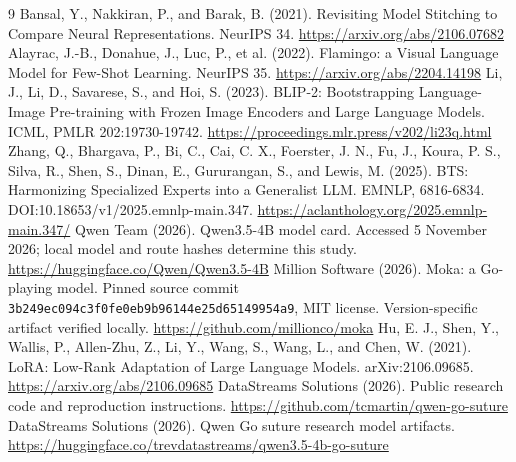 \documentclass[11pt]{article}
\begin{document}
\begin{thebibliography}{9}
 Bansal, Y., Nakkiran, P., and Barak, B. (2021). Revisiting Model Stitching to Compare Neural Representations. NeurIPS 34. \url{https://arxiv.org/abs/2106.07682}
 Alayrac, J.-B., Donahue, J., Luc, P., et al. (2022). Flamingo: a Visual Language Model for Few-Shot Learning. NeurIPS 35. \url{https://arxiv.org/abs/2204.14198}
 Li, J., Li, D., Savarese, S., and Hoi, S. (2023). BLIP-2: Bootstrapping Language-Image Pre-training with Frozen Image Encoders and Large Language Models. ICML, PMLR 202:19730-19742. \url{https://proceedings.mlr.press/v202/li23q.html}
 Zhang, Q., Bhargava, P., Bi, C., Cai, C. X., Foerster, J. N., Fu, J., Koura, P. S., Silva, R., Shen, S., Dinan, E., Gururangan, S., and Lewis, M. (2025). BTS: Harmonizing Specialized Experts into a Generalist LLM. EMNLP, 6816-6834. DOI:10.18653/v1/2025.emnlp-main.347. \url{https://aclanthology.org/2025.emnlp-main.347/}
 Qwen Team (2026). Qwen3.5-4B model card. Accessed 5 November 2026; local model and route hashes determine this study. \url{https://huggingface.co/Qwen/Qwen3.5-4B}
 Million Software (2026). Moka: a Go-playing model. Pinned source commit \texttt{3b249ec0\allowbreak 94c3f0fe\allowbreak 0eb9b961\allowbreak 44e25d65\allowbreak 149954a9}, MIT license. Version-specific artifact verified locally. \url{https://github.com/millionco/moka}
 Hu, E. J., Shen, Y., Wallis, P., Allen-Zhu, Z., Li, Y., Wang, S., Wang, L., and Chen, W. (2021). LoRA: Low-Rank Adaptation of Large Language Models. arXiv:2106.09685. \url{https://arxiv.org/abs/2106.09685}
 DataStreams Solutions (2026). Public research code and reproduction instructions. \url{https://github.com/tcmartin/qwen-go-suture}
 DataStreams Solutions (2026). Qwen Go suture research model artifacts. \url{https://huggingface.co/trevdatastreams/qwen3.5-4b-go-suture}
\end{thebibliography}
\end{document}
